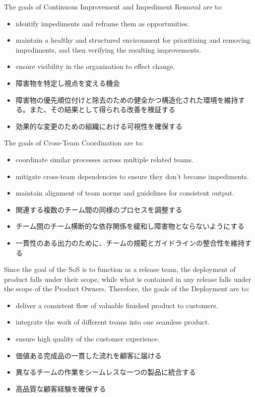 \documentclass[12pt,a4paper,parskip=full]{scrartcl}
\begin{document}
The goals of Continuous Improvement and Impediment Removal are to:
\begin{itemize}
\item identify impediments and reframe them as opportunities.
\item maintain a healthy and structured environment for prioritizing and
removing impediments, and then verifying the resulting improvements.
\item ensure visibility in the organization to effect change.
\end{itemize}
\fi
\begin{itemize}
\item 障害物を特定し視点を変える機会
\item 障害物の優先順位付けと除去のための健全かつ構造化された環境を維持する。また、その結果として得られる改善を検証する
\item 効果的な変更のための組織における可視性を確保する
\end{itemize}
The goals of Cross-Team Coordination are to:
\begin{itemize}
\item coordinate similar processes across multiple related teams.
\item mitigate cross-team dependencies to ensure they don't become
impediments.
\item maintain alignment of team norms and guidelines for consistent output.
\end{itemize}
\fi
\begin{itemize}
\item 関連する複数のチーム間の同様のプロセスを調整する
\item チーム間のチーム横断的な依存関係を緩和し障害物とならないようにする
\item 一貫性のある出力のために、チームの規範とガイドラインの整合性を維持する
\end{itemize}

Since the goal of the SoS is to function as a release team, the deployment
of product falls under their scope, while what is contained in any release
falls under the scope of the Product Owners. Therefore, the goals of the
Deployment are to:
\begin{itemize}
\item deliver a consistent flow of valuable finished product to customers.
\item integrate the work of different teams into one seamless product.
\item ensure high quality of the customer experience.
\end{itemize}
\fi
\begin{itemize}
\item 価値ある完成品の一貫した流れを顧客に届ける
\item 異なるチームの作業をシームレスな一つの製品に統合する
\item 高品質な顧客経験を確保する
\end{itemize}
\end{document}
